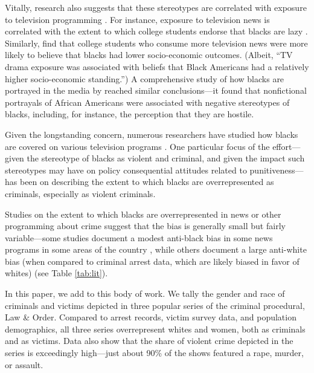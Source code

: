 \documentclass[12pt, letterpaper]{article}
\begin{document}
Vitally, research also suggests that these stereotypes are correlated with exposure to television programming \citep{busselle2002television, entman2001black, armstrong1992tv}. For instance, exposure to television news is correlated with the extent to which college students endorse that blacks are lazy \citep{busselle2002television}. Similarly, \citet{armstrong1992tv} find that college students who consume more television news were more likely to believe that blacks had lower socio-economic outcomes. (Albeit, ``TV drama exposure was associated with beliefs that Black Americans had a relatively higher socio-economic standing.'') A comprehensive study of how blacks are portrayed in the media by \citet{entman2001black} reached similar conclusions---it found that nonfictional portrayals of African Americans were associated with negative stereotypes of blacks, including, for instance, the perception that they are hostile.

Given the longstanding concern, numerous researchers have studied how blacks are covered on various television programs \citep[for e.g.,][]{entman2001black, eschholz2004images}. One particular focus of the effort---given the stereotype of blacks as violent and criminal, and given the impact such stereotypes may have on policy consequential attitudes related to punitiveness---has been on describing the extent to which blacks are overrepresented as criminals, especially as violent criminals. 

Studies on the extent to which blacks are overrepresented in news or other programming about crime suggest that the bias is generally small but fairly variable---some studies document a modest anti-black bias in some news programs in some areas of the country \citep{gilliam1996crime}, while others document a large anti-white bias (when compared to criminal arrest data, which are likely biased in favor of whites) \citep{chiricos2002racial, dixon2000overrepresentation, eschholz2004images} (see Table \ref{tab:lit}). 



In this paper, we add to this body of work. We tally the gender and race of criminals and victims depicted in three popular series of the criminal procedural, Law \& Order. Compared to arrest records, victim survey data, and population demographics, all three series overrepresent whites and women, both as criminals and as victims. Data also show that the share of violent crime depicted in the series is exceedingly high---just about 90\% of the shows featured a rape, murder, or assault.
\end{document}
